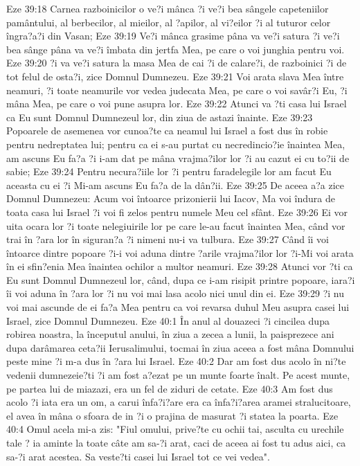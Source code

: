 Eze 39:18  Carnea razboinicilor o ve?i mânca ?i ve?i bea sângele capeteniilor pamântului, al berbecilor, al mieilor, al ?apilor, al vi?eilor ?i al tuturor celor îngra?a?i din Vasan;
Eze 39:19  Ve?i mânca grasime pâna va ve?i satura ?i ve?i bea sânge pâna va ve?i îmbata din jertfa Mea, pe care o voi junghia pentru voi.
Eze 39:20  ?i va ve?i satura la masa Mea de cai ?i de calare?i, de razboinici ?i de tot felul de osta?i, zice Domnul Dumnezeu.
Eze 39:21  Voi arata slava Mea între neamuri, ?i toate neamurile vor vedea judecata Mea, pe care o voi savâr?i Eu, ?i mâna Mea, pe care o voi pune asupra lor.
Eze 39:22  Atunci va ?ti casa lui Israel ca Eu sunt Domnul Dumnezeul lor, din ziua de astazi înainte.
Eze 39:23  Popoarele de asemenea vor cunoa?te ca neamul lui Israel a fost dus în robie pentru nedreptatea lui; pentru ca ei s-au purtat cu necredincio?ie înaintea Mea, am ascuns Eu fa?a ?i i-am dat pe mâna vrajma?ilor lor ?i au cazut ei cu to?ii de sabie;
Eze 39:24  Pentru necura?iile lor ?i pentru faradelegile lor am facut Eu aceasta cu ei ?i Mi-am ascuns Eu fa?a de la dân?ii.
Eze 39:25  De aceea a?a zice Domnul Dumnezeu: Acum voi întoarce prizonierii lui Iacov, Ma voi îndura de toata casa lui Israel ?i voi fi zelos pentru numele Meu cel sfânt.
Eze 39:26  Ei vor uita ocara lor ?i toate nelegiuirile lor pe care le-au facut înaintea Mea, când vor trai în ?ara lor în siguran?a ?i nimeni nu-i va tulbura.
Eze 39:27  Când îi voi întoarce dintre popoare ?i-i voi aduna dintre ?arile vrajma?ilor lor ?i-Mi voi arata în ei sfin?enia Mea înaintea ochilor a multor neamuri.
Eze 39:28  Atunci vor ?ti ca Eu sunt Domnul Dumnezeul lor, când, dupa ce i-am risipit printre popoare, iara?i îi voi aduna în ?ara lor ?i nu voi mai lasa acolo nici unul din ei.
Eze 39:29  ?i nu voi mai ascunde de ei fa?a Mea pentru ca voi revarsa duhul Meu asupra casei lui Israel, zice Domnul Dumnezeu.
Eze 40:1  În anul al douazeci ?i cincilea dupa robirea noastra, la începutul anului, în ziua a zecea a lunii, la paisprezece ani dupa darâmarea ceta?ii Ierusalimului, tocmai în ziua aceea a fost mâna Domnului peste mine ?i m-a dus în ?ara lui Israel.
Eze 40:2  Dar am fost dus acolo în ni?te vedenii dumnezeie?ti ?i am fost a?ezat pe un munte foarte înalt. Pe acest munte, pe partea lui de miazazi, era un fel de ziduri de cetate.
Eze 40:3  Am fost dus acolo ?i iata era un om, a carui înfa?i?are era ca înfa?i?area aramei stralucitoare, el avea în mâna o sfoara de in ?i o prajina de masurat ?i statea la poarta.
Eze 40:4  Omul acela mi-a zis: "Fiul omului, prive?te cu ochii tai, asculta cu urechile tale ? ia aminte la toate câte am sa-?i arat, caci de aceea ai fost tu adus aici, ca sa-?i arat acestea. Sa veste?ti casei lui Israel tot ce vei vedea".
